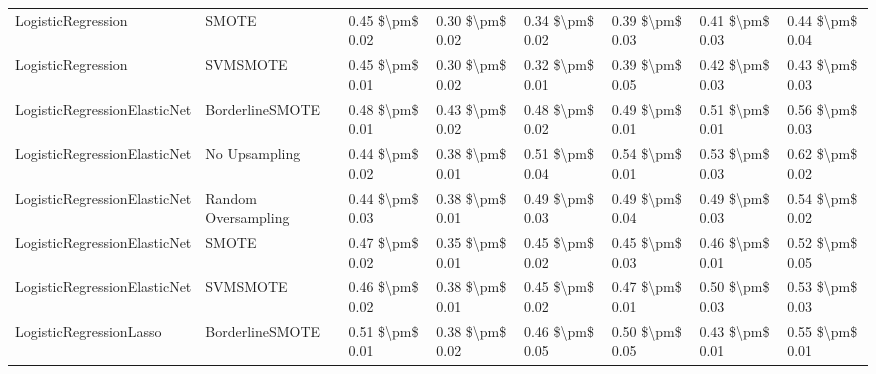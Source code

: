 \begin{tabular}{llllllll}
             LogisticRegression &                         SMOTE & 0.45 \$\textbackslash pm\$ 0.02 &           0.30 \$\textbackslash pm\$ 0.02 &       0.34 \$\textbackslash pm\$ 0.02 &        0.39 \$\textbackslash pm\$ 0.03 &                         0.41 \$\textbackslash pm\$ 0.03 & 0.44 \$\textbackslash pm\$ 0.04 \\
             LogisticRegression &                      SVMSMOTE & 0.45 \$\textbackslash pm\$ 0.01 &           0.30 \$\textbackslash pm\$ 0.02 &       0.32 \$\textbackslash pm\$ 0.01 &        0.39 \$\textbackslash pm\$ 0.05 &                         0.42 \$\textbackslash pm\$ 0.03 & 0.43 \$\textbackslash pm\$ 0.03 \\
   LogisticRegressionElasticNet &               BorderlineSMOTE & 0.48 \$\textbackslash pm\$ 0.01 &           0.43 \$\textbackslash pm\$ 0.02 &       0.48 \$\textbackslash pm\$ 0.02 &        0.49 \$\textbackslash pm\$ 0.01 &                         0.51 \$\textbackslash pm\$ 0.01 & 0.56 \$\textbackslash pm\$ 0.03 \\
   LogisticRegressionElasticNet &                 No Upsampling & 0.44 \$\textbackslash pm\$ 0.02 &           0.38 \$\textbackslash pm\$ 0.01 &       0.51 \$\textbackslash pm\$ 0.04 &        0.54 \$\textbackslash pm\$ 0.01 &                         0.53 \$\textbackslash pm\$ 0.03 & 0.62 \$\textbackslash pm\$ 0.02 \\
   LogisticRegressionElasticNet &           Random Oversampling & 0.44 \$\textbackslash pm\$ 0.03 &           0.38 \$\textbackslash pm\$ 0.01 &       0.49 \$\textbackslash pm\$ 0.03 &        0.49 \$\textbackslash pm\$ 0.04 &                         0.49 \$\textbackslash pm\$ 0.03 & 0.54 \$\textbackslash pm\$ 0.02 \\
   LogisticRegressionElasticNet &                         SMOTE & 0.47 \$\textbackslash pm\$ 0.02 &           0.35 \$\textbackslash pm\$ 0.01 &       0.45 \$\textbackslash pm\$ 0.02 &        0.45 \$\textbackslash pm\$ 0.03 &                         0.46 \$\textbackslash pm\$ 0.01 & 0.52 \$\textbackslash pm\$ 0.05 \\
   LogisticRegressionElasticNet &                      SVMSMOTE & 0.46 \$\textbackslash pm\$ 0.02 &           0.38 \$\textbackslash pm\$ 0.01 &       0.45 \$\textbackslash pm\$ 0.02 &        0.47 \$\textbackslash pm\$ 0.01 &                         0.50 \$\textbackslash pm\$ 0.03 & 0.53 \$\textbackslash pm\$ 0.03 \\
        LogisticRegressionLasso &               BorderlineSMOTE & 0.51 \$\textbackslash pm\$ 0.01 &           0.38 \$\textbackslash pm\$ 0.02 &       0.46 \$\textbackslash pm\$ 0.05 &        0.50 \$\textbackslash pm\$ 0.05 &                         0.43 \$\textbackslash pm\$ 0.01 & 0.55 \$\textbackslash pm\$ 0.01 \\

\end{tabular}

